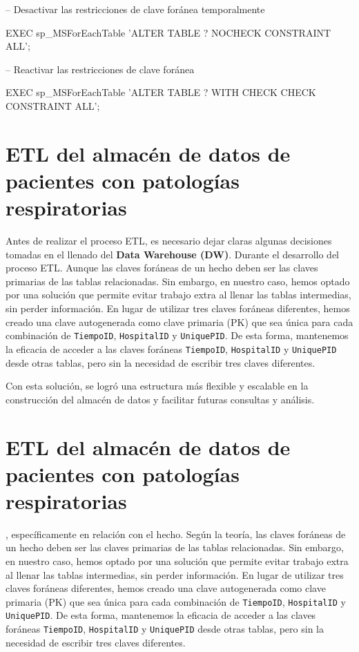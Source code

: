 \documentclass[12pt, a4paper, twoside]{article}
\begin{document}
	-- Desactivar las restricciones de clave foránea temporalmente
	
	
	EXEC sp\_MSForEachTable 'ALTER TABLE ? NOCHECK CONSTRAINT ALL';
	
	-- Reactivar las restricciones de clave foránea
	
	
	EXEC sp\_MSForEachTable 'ALTER TABLE ? WITH CHECK CHECK CONSTRAINT ALL';
	
	\section{ETL del almacén de datos de pacientes con patologías respiratorias}
	
	Antes de realizar el proceso ETL, es necesario dejar claras algunas decisiones tomadas en el llenado del \textbf{Data Warehouse (DW)}. Durante el desarrollo del proceso ETL. Aunque las claves foráneas de un hecho deben ser las claves primarias de las tablas relacionadas. Sin embargo, en nuestro caso, hemos optado por una solución que permite evitar trabajo extra al llenar las tablas intermedias, sin perder información. En lugar de utilizar tres claves foráneas diferentes, hemos creado una clave autogenerada como clave primaria (PK) que sea única para cada combinación de \texttt{TiempoID}, \texttt{HospitalID} y \texttt{UniquePID}. De esta forma, mantenemos la eficacia de acceder a las claves foráneas \texttt{TiempoID}, \texttt{HospitalID} y \texttt{UniquePID} desde otras tablas, pero sin la necesidad de escribir tres claves diferentes.
	
	Con esta solución, se logró una estructura más flexible y escalable en la construcción del almacén de datos y facilitar futuras consultas y análisis.
	
	\section{ETL del almacén de datos de pacientes con patologías respiratorias}
	
	, específicamente en relación con el hecho. Según la teoría, las claves foráneas de un hecho deben ser las claves primarias de las tablas relacionadas. Sin embargo, en nuestro caso, hemos optado por una solución que permite evitar trabajo extra al llenar las tablas intermedias, sin perder información. En lugar de utilizar tres claves foráneas diferentes, hemos creado una clave autogenerada como clave primaria (PK) que sea única para cada combinación de \texttt{TiempoID}, \texttt{HospitalID} y \texttt{UniquePID}. De esta forma, mantenemos la eficacia de acceder a las claves foráneas \texttt{TiempoID}, \texttt{HospitalID} y \texttt{UniquePID} desde otras tablas, pero sin la necesidad de escribir tres claves diferentes.
	
\end{document}
